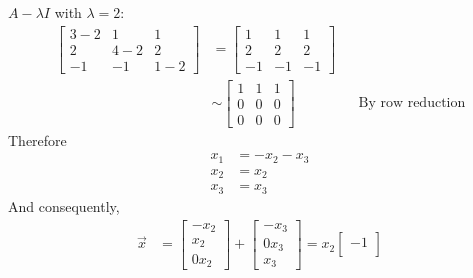 \documentclass[10pt,letterpaper,final]{report}
\newcommand{\reason}[1]{&& \text{#1}}
\begin{document}
\begin{enumerate}[label=(\alph*)]
        $A - \lambda I$ with $\lambda = 2$:
        \begin{align*}
          \begin{bmatrix}
            3 - 2 & 1     & 1     \\
            2     & 4 - 2 & 2     \\
            -1    & -1    & 1 - 2
          \end{bmatrix} & = \begin{bmatrix}
                              1  & 1  & 1  \\
                              2  & 2  & 2  \\
                              -1 & -1 & -1
                            \end{bmatrix}                                        \\[1ex]
                                     & \sim \begin{bmatrix}
                                              1 & 1 & 1 \\
                                              0 & 0 & 0 \\
                                              0 & 0 & 0
                                            \end{bmatrix} \reason{By row reduction}
        \end{align*}
        Therefore
        \begin{align*}
          x_1 & = -x_2 - x_3 \\
          x_2 & = x_2        \\
          x_3 & = x_3
        \end{align*}
        And consequently,
        \begin{align*}
          \vec{x} & = \begin{bmatrix}
                        -x_2 \\
                        x_2  \\
                        0x_2
                      \end{bmatrix} + \begin{bmatrix}
                                        -x_3 \\
                                        0x_3 \\
                                        x_3
                                      \end{bmatrix} = x_2\begin{bmatrix}
                                                           -1 \\

\end{bmatrix}
\end{align*}
\end{enumerate}
\end{document}
